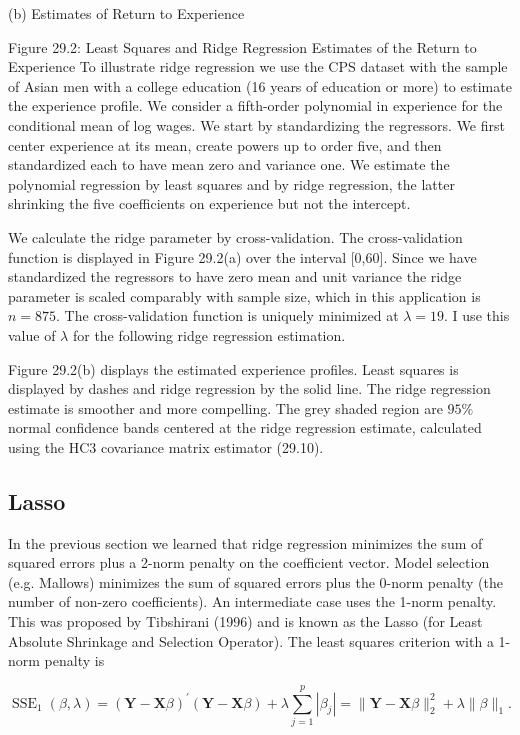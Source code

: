 \documentclass[10pt]{article}
\begin{document}
(b) Estimates of Return to Experience

Figure 29.2: Least Squares and Ridge Regression Estimates of the Return to Experience To illustrate ridge regression we use the CPS dataset with the sample of Asian men with a college education (16 years of education or more) to estimate the experience profile. We consider a fifth-order polynomial in experience for the conditional mean of log wages. We start by standardizing the regressors. We first center experience at its mean, create powers up to order five, and then standardized each to have mean zero and variance one. We estimate the polynomial regression by least squares and by ridge regression, the latter shrinking the five coefficients on experience but not the intercept.

We calculate the ridge parameter by cross-validation. The cross-validation function is displayed in Figure 29.2(a) over the interval [0,60]. Since we have standardized the regressors to have zero mean and unit variance the ridge parameter is scaled comparably with sample size, which in this application is $n=875$. The cross-validation function is uniquely minimized at $\lambda=19$. I use this value of $\lambda$ for the following ridge regression estimation.

Figure 29.2(b) displays the estimated experience profiles. Least squares is displayed by dashes and ridge regression by the solid line. The ridge regression estimate is smoother and more compelling. The grey shaded region are $95 \%$ normal confidence bands centered at the ridge regression estimate, calculated using the HC3 covariance matrix estimator (29.10).

\subsection{Lasso}
In the previous section we learned that ridge regression minimizes the sum of squared errors plus a 2-norm penalty on the coefficient vector. Model selection (e.g. Mallows) minimizes the sum of squared errors plus the 0-norm penalty (the number of non-zero coefficients). An intermediate case uses the 1-norm penalty. This was proposed by Tibshirani (1996) and is known as the Lasso (for Least Absolute Shrinkage and Selection Operator). The least squares criterion with a 1-norm penalty is

$$
\operatorname{SSE}_{1}(\beta, \lambda)=(\boldsymbol{Y}-\boldsymbol{X} \beta)^{\prime}(\boldsymbol{Y}-\boldsymbol{X} \beta)+\lambda \sum_{j=1}^{p}\left|\beta_{j}\right|=\|\boldsymbol{Y}-\boldsymbol{X} \beta\|_{2}^{2}+\lambda\|\beta\|_{1} .
$$
\end{document}

